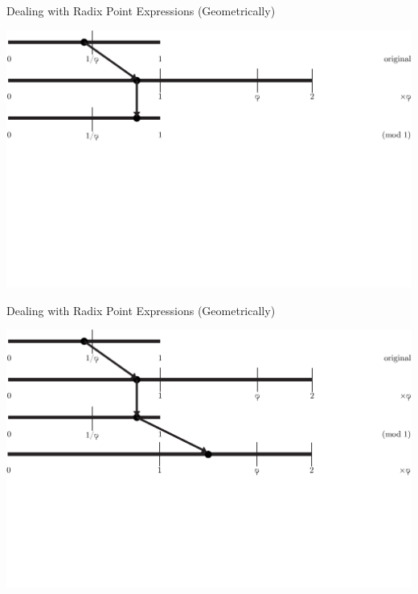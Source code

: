 \documentclass{beamer}
\begin{document}
\begin{frame}{Dealing with Radix Point Expressions (Geometrically)}
  \addtocounter{framenumber}{-1}
  \begin{example}
    \includegraphics[width=\textwidth,height=0.75\textheight]{images/Phinary/3}
  \end{example}
\end{frame}

\begin{frame}{Dealing with Radix Point Expressions (Geometrically)}
  \addtocounter{framenumber}{-1}
  \begin{example}
    \includegraphics[width=\textwidth,height=0.75\textheight]{images/Phinary/4}
  \end{example}
\end{frame}
\end{document}
